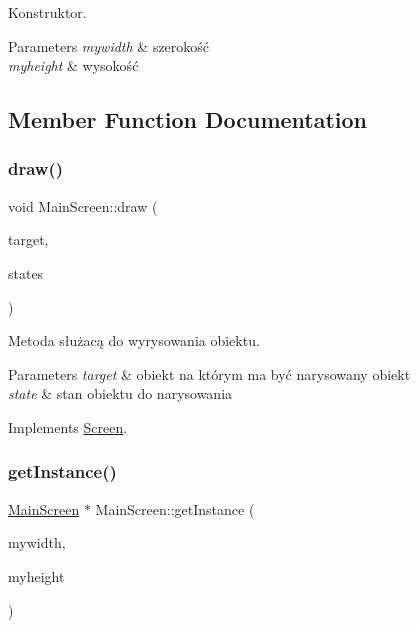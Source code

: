 Konstruktor. 


\begin{DoxyParams}{Parameters}
{\em mywidth} & szerokość \\
\hline
{\em myheight} & wysokość \\
\hline
\end{DoxyParams}


\subsection{Member Function Documentation}
\mbox{\label{class_main_screen_a4869b4bcd4bc03ef503904395bc4e68b}} 
\subsubsection{\texorpdfstring{draw()}{draw()}}
{\footnotesize\ttfamily void Main\+Screen\+::draw (\begin{DoxyParamCaption}\item[{Render\+Target \&}]{target,  }\item[{Render\+States}]{states }\end{DoxyParamCaption})\hspace{0.3cm}{\ttfamily [virtual]}}



Metoda służacą do wyrysowania obiektu. 


\begin{DoxyParams}{Parameters}
{\em target} & obiekt na którym ma być narysowany obiekt \\
\hline
{\em state} & stan obiektu do narysowania \\
\hline
\end{DoxyParams}


Implements \mbox{\hyperlink{class_screen_ab9f74bb4bf0d0ee2a8280354ba0ff85e}{Screen}}.

\mbox{\label{class_main_screen_a9e03cd8e4cccb0e4b9ba3b8c43d10785}} 
\subsubsection{\texorpdfstring{getInstance()}{getInstance()}}
{\footnotesize\ttfamily \mbox{\hyperlink{class_main_screen}{Main\+Screen}} $\ast$ Main\+Screen\+::get\+Instance (\begin{DoxyParamCaption}\item[{double}]{mywidth,  }\item[{double}]{myheight }\end{DoxyParamCaption})\hspace{0.3cm}{\ttfamily [static]}}



